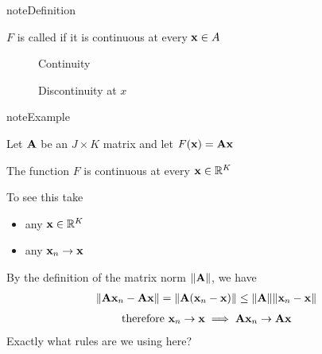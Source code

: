 \documentclass[letterpaper,10pt,english]{jupyterBook}
\begin{document}
\begin{sphinxadmonition}{note}{Definition}

\sphinxAtStartPar
\(F\) is called  if it is continuous at every \({\bf x} \in
A\)
\end{sphinxadmonition}

\begin{figure}[htbp]
\centering
\capstart

\noindent{}
\caption{Continuity}\label{\detokenize{06.optimization_fundamentals:cont-func2}}\end{figure}

\begin{figure}[htbp]
\centering
\capstart

\noindent{}
\caption{Discontinuity at \(x\)}\label{\detokenize{06.optimization_fundamentals:discont-func2}}\end{figure}

\begin{sphinxadmonition}{note}{Example}

\sphinxAtStartPar
Let \({\bf A}\) be an \(J \times K\) matrix and let \(F({\bf x}) = {\bf A}
{\bf x}\)

\sphinxAtStartPar
The function \(F\) is continuous at every \({\bf x} \in \mathbb{R}^K\)
\end{sphinxadmonition}

\sphinxAtStartPar
To see this take
\begin{itemize}
\item {} 
\sphinxAtStartPar
any \({\bf x} \in \mathbb{R}^K\)

\item {} 
\sphinxAtStartPar
any \({\bf x}_n \to {\bf x}\)

\end{itemize}

\sphinxAtStartPar
By the definition of the matrix norm \(\| {\bf A} \|\), we have
\begin{equation*}
\begin{split}
%
\| {\bf A} {\bf x}_n - {\bf A} {\bf x} \|
= \| {\bf A} ({\bf x}_n - {\bf x}) \|
\leq \| {\bf A} \| \| {\bf x}_n - {\bf x} \|
%
\end{split}
\end{equation*}\begin{equation*}
\begin{split}
%
\text{therefore }
{\bf x}_n \to {\bf x} \implies
{\bf A} {\bf x}_n \to {\bf A} {\bf x} 
%
\end{split}
\end{equation*}
\sphinxAtStartPar
{} Exactly what rules are we using here?
\end{document}
